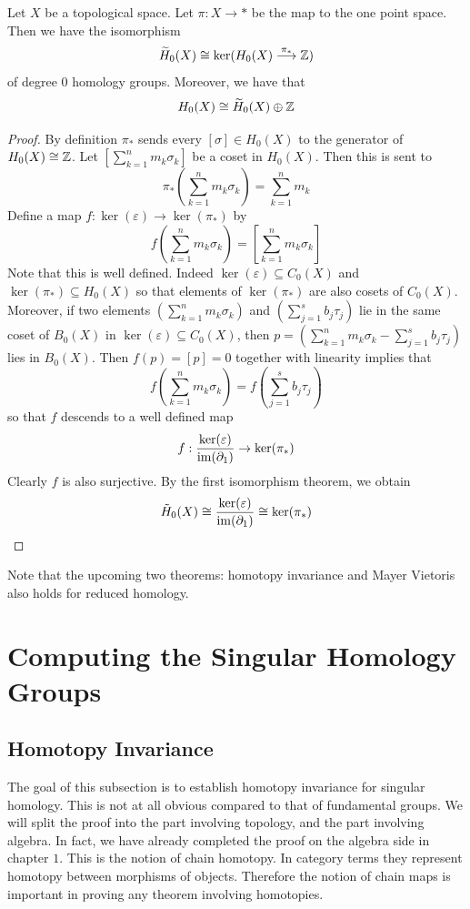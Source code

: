 \documentclass[a4paper]{article}
\begin{document}
\begin{prp}{}{} Let $X$ be a topological space. Let $\pi:X\to\ast$ be the map to the one point space. Then we have the isomorphism $$\widetilde{H}_0(X)\cong\ker(H_0(X)\overset{\pi_\ast}{\longrightarrow}\mathbb{Z})$$ of degree $0$ homology groups. Moreover, we have that $$H_0(X)\cong\widetilde{H}_0(X)\oplus\mathbb{Z}$$ \tcbline
\begin{proof}
By definition $\pi_\ast$ sends every $[\sigma]\in H_0(X)$ to the generator of $H_0(X)\cong\mathbb{Z}$. Let $\left[\sum_{k=1}^n m_k\sigma_k\right]$ be a coset in $H_0(X)$. Then this is sent to $$\pi_\ast\left(\sum_{k=1}^n m_k\sigma_k\right)=\sum_{k=1}^nm_k$$ Define a map $f:\ker(\varepsilon)\to\ker(\pi_\ast)$ by $$f\left(\sum_{k=1}^n m_k\sigma_k\right)=\left[\sum_{k=1}^n m_k\sigma_k\right]$$ Note that this is well defined. Indeed $\ker(\varepsilon)\subseteq C_0(X)$ and $\ker(\pi_\ast)\subseteq H_0(X)$ so that elements of $\ker(\pi_\ast)$ are also cosets of $C_0(X)$. Moreover, if two elements $\left(\sum_{k=1}^n m_k\sigma_k\right)$ and $\left(\sum_{j=1}^s b_j\tau_j\right)$ lie in the same coset of $B_0(X)$ in $\ker(\varepsilon)\subseteq C_0(X)$, then $p=\left(\sum_{k=1}^n m_k\sigma_k-\sum_{j=1}^s b_j\tau_j\right)$ lies in $B_0(X)$. Then $f(p)=[p]=0$ together with linearity implies that $$f\left(\sum_{k=1}^n m_k\sigma_k\right)=f\left(\sum_{j=1}^s b_j\tau_j\right)$$ so that $f$ descends to a well defined map $$f:\frac{\ker(\varepsilon)}{\operatorname{im}(\partial_1)}\to\ker(\pi_\ast)$$ Clearly $f$ is also surjective. By the first isomorphism theorem, we obtain $$\tilde{H}_0(X)\cong\frac{\ker(\varepsilon)}{\operatorname{im}(\partial_1)}\cong\ker(\pi_\ast)$$ 
\end{proof}
\end{prp}

Note that the upcoming two theorems: homotopy invariance and Mayer Vietoris also holds for reduced homology. 

\pagebreak

\section{Computing the Singular Homology Groups}
\subsection{Homotopy Invariance}
The goal of this subsection is to establish homotopy invariance for singular homology. This is not at all obvious compared to that of fundamental groups. We will split the proof into the part involving topology, and the part involving algebra. In fact, we have already completed the proof on the algebra side in chapter $1$. This is the notion of chain homotopy. In category terms they represent homotopy between morphisms of objects. Therefore the notion of chain maps is important in proving any theorem involving homotopies. \\~\\
\end{document}

